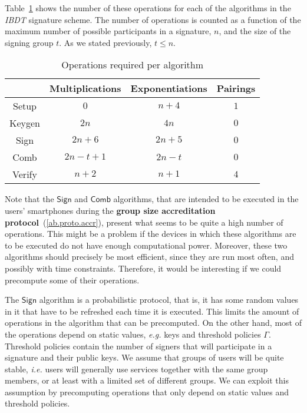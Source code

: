 \documentclass[11pt]{llncs}
\def\Sign{\mathsf{Sign}}
\def\Comb{\mathsf{Comb}}
\begin{document}
Table~\ref{ab.tab.ibdttimes} shows the number of
these operations for each of the algorithms
in the \emph{IBDT} signature scheme.
The number of operations is counted as a function of the
maximum number of possible participants in a signature, $n$,
and the size of the signing group $t$.
As we stated previously, $t \le n$.

\begin{table}[!h]
\renewcommand{\arraystretch}{1.3}
\caption{Operations required per algorithm} \label{ab.tab.ibdttimes}
\centering
\begin{tabular}{c||c||c||c}
\hline
& \bfseries Multiplications & \bfseries Exponentiations & \bfseries Pairings \\
\hline
\hline
Setup & $0$ & $n+4$ & $1$\\
Keygen & $2n$ & $4n$ & $0$ \\
Sign	& $2n+6$	 & $2n + 5$ & $0$\\
Comb & $2n-t+1$ & $2n - t$ & $0$\\
Verify & $n+2$ & $n+1$ & $4$ \\
\hline
\end{tabular}
\end{table}

Note that the $\Sign$ and $\Comb$ algorithms, that are intended to be
executed in the users' smartphones during the
\textbf{group size accreditation protocol}~(\ref{ab.proto.accr}),
present what seems to be quite a high number of operations.
This might be a problem if the devices in which these algorithms
are to be executed do not have enough computational power.
Moreover, these two algorithms should precisely be
most efficient, since they are run most often, and possibly
with time constraints.
Therefore, it would be interesting if we could precompute
some of their operations.

The $\Sign$ algorithm is a probabilistic protocol, that is,
it has some random values in it that have to be
refreshed each time it is executed. This limits the amount
of operations in the algorithm that can be precomputed.
On the other hand, most of the operations depend on
static values, \emph{e.g.} keys and threshold policies $\Gamma$.
Threshold policies contain the number of signers that will
participate in a signature and their public keys.
We assume that groups of users will be quite stable,
\emph{i.e.} users will generally use services
together with the same
group members, or at least with a limited set of different groups.
We can exploit this assumption by precomputing operations
that only depend on static values and threshold policies.
\end{document}
